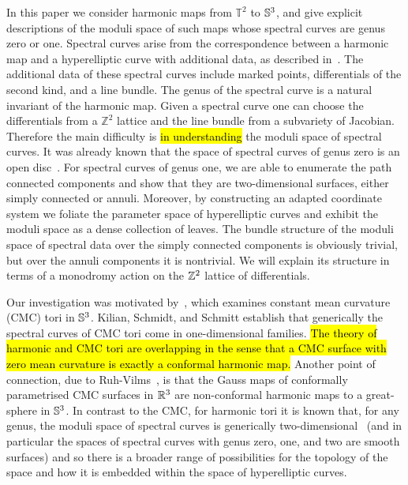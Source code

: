 \documentclass{article}
\begin{document}
In this paper we consider harmonic maps from $\mathbb{T}^2$ to $\S^3$,
and give explicit descriptions of the moduli space of such maps whose spectral curves are genus zero or one. 
Spectral curves arise from the correspondence between a harmonic map and a hyperelliptic curve with additional data, as described in~\cite{Hitchin1990}. The additional data of these spectral curves include marked points, differentials of the second kind, and a line bundle. The genus of the spectral curve is a natural invariant of the harmonic map.
Given a spectral curve one can choose the differentials from a $\mathbb{Z}^2$ lattice and the line bundle from a subvariety of Jacobian. Therefore the main difficulty is \hl{in understanding} the moduli space of spectral curves.
It was already known that the space of spectral curves of genus zero is an open disc~\cite[Section 9]{Hitchin1990}.
For spectral curves of genus one, we are able to enumerate the path connected components and show that they are two-dimensional surfaces, either simply connected or annuli. Moreover, by constructing an adapted coordinate system we foliate the parameter space of hyperelliptic curves and exhibit the moduli space as a dense collection of leaves.
The bundle structure of the moduli space of spectral data over the simply connected components is obviously trivial, but over the annuli components it is nontrivial. We will explain its structure in terms of a monodromy action on the $\Z^2$ lattice of differentials.

Our investigation was motivated by~\cite{Kilian2015}, which examines constant mean curvature (CMC) tori in $\S^3$. 
Kilian, Schmidt, and Schmitt establish that generically the spectral curves of CMC tori come in one-dimensional families. \hl{The theory of harmonic and CMC tori are overlapping in the sense that a CMC surface with zero mean curvature is exactly a conformal harmonic map.}
Another point of connection, due to Ruh-Vilms~\cite{Ruh1970}, is that the Gauss maps of conformally parametrised CMC surfaces in $\R^3$ are non-conformal harmonic maps to a great-sphere in $\S^3$.
In contrast to the CMC, for harmonic tori it is known that, for any genus, the moduli space of spectral curves is generically two-dimensional~\cite{Carberry2019} (and in particular the spaces of spectral curves with genus zero, one, and two are smooth surfaces) and so there is a broader range of possibilities for the topology of the space and how it is embedded within the space of hyperelliptic curves.
\end{document}
